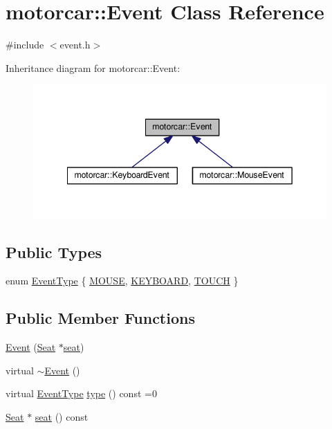 \hypertarget{classmotorcar_1_1Event}{\section{motorcar\-:\-:Event Class Reference}
\label{classmotorcar_1_1Event}
}


{\ttfamily \#include $<$event.\-h$>$}



Inheritance diagram for motorcar\-:\-:Event\-:
\nopagebreak
\begin{figure}[H]
\begin{center}
\leavevmode
\includegraphics[width=342pt]{classmotorcar_1_1Event__inherit__graph}
\end{center}
\end{figure}
\subsection*{Public Types}
\begin{DoxyCompactItemize}
\item 
enum \hyperlink{classmotorcar_1_1Event_af4f5d9ed7dc2d8a2324fa5b0d32c29b0}{Event\-Type} \{ \hyperlink{classmotorcar_1_1Event_af4f5d9ed7dc2d8a2324fa5b0d32c29b0a03dadb42ea3036c0a8b1bfa6fac4072e}{M\-O\-U\-S\-E}, 
\hyperlink{classmotorcar_1_1Event_af4f5d9ed7dc2d8a2324fa5b0d32c29b0a6a50b4eb2b4d2086997bc94fc075d4c9}{K\-E\-Y\-B\-O\-A\-R\-D}, 
\hyperlink{classmotorcar_1_1Event_af4f5d9ed7dc2d8a2324fa5b0d32c29b0a71e14a650a78d42baa12a22e5cd4ad00}{T\-O\-U\-C\-H}
 \}
\end{DoxyCompactItemize}
\subsection*{Public Member Functions}
\begin{DoxyCompactItemize}
\item 
\hyperlink{classmotorcar_1_1Event_aed0a7622e5b4de79eb9c9115993aebbe}{Event} (\hyperlink{classmotorcar_1_1Seat}{Seat} $\ast$\hyperlink{classmotorcar_1_1Event_a7426828c8402193cac63a7b3fda5a17e}{seat})
\item 
virtual \hyperlink{classmotorcar_1_1Event_a3ff67253553db1d656e32a5e660a3ecb}{$\sim$\-Event} ()
\item 
virtual \hyperlink{classmotorcar_1_1Event_af4f5d9ed7dc2d8a2324fa5b0d32c29b0}{Event\-Type} \hyperlink{classmotorcar_1_1Event_a195195c53c024bc76aa0e550ffe438a6}{type} () const =0
\item 
\hyperlink{classmotorcar_1_1Seat}{Seat} $\ast$ \hyperlink{classmotorcar_1_1Event_a7426828c8402193cac63a7b3fda5a17e}{seat} () const 
\end{DoxyCompactItemize}


